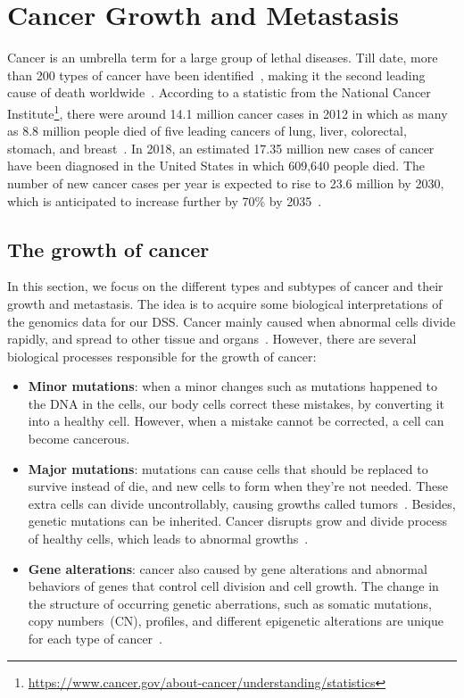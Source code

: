 \section{Cancer Growth and Metastasis}
\label{cancer_growth}
Cancer is an umbrella term for a large group of lethal diseases. Till date, more than 200 types of cancer have been identified~\cite{82Tomczak}, making it the second leading cause of death worldwide~\cite{pancan}. According to a statistic from the National Cancer Institute\footnote{\url{https://www.cancer.gov/about-cancer/understanding/statistics}}, there were around 14.1 million cancer cases in 2012 in which as many as 8.8 million people died of five leading cancers of lung, liver, colorectal, stomach, and breast~\cite{stat}. In 2018, an estimated 17.35 million new cases of cancer have been diagnosed in the United States in which 609,640 people died. The number of new cancer cases per year is expected to rise to 23.6 million by 2030, which is anticipated to increase further by 70\% by 2035~\cite{71Torre}. 

\subsection{The growth of cancer}
In this section, we focus on the different types and subtypes of cancer and their growth and metastasis. The idea is to acquire some biological interpretations of the genomics data for our DSS. Cancer mainly caused when abnormal cells divide rapidly, and spread to other tissue and organs~\cite{pancan}. However, there are several biological processes responsible for the growth of cancer: 

\begin{itemize}[noitemsep]
    \item \textbf{Minor mutations}: when a minor changes such as mutations happened to the DNA in the cells, our body cells correct these mistakes, by converting it into a healthy cell. However, when a mistake cannot be corrected, a cell can become cancerous. 
    \item \textbf{Major mutations}: mutations can cause cells that should be replaced to survive instead of die, and new cells to form when they're not needed. These extra cells can divide uncontrollably, causing growths called tumors~\cite{82Tomczak}. Besides, genetic mutations can be inherited. Cancer disrupts grow and divide process of healthy cells, which leads to abnormal growths~\cite{pancan}. 
    \item \textbf{Gene alterations}: cancer also caused by gene alterations and abnormal behaviors of genes that control cell division and cell growth. The change in the structure of occurring genetic aberrations, such as somatic mutations, copy numbers~(CN), profiles, and different epigenetic alterations are unique for each type of cancer~\cite{82Tomczak,13cancerdef,19Cruz}. 
\end{itemize}

